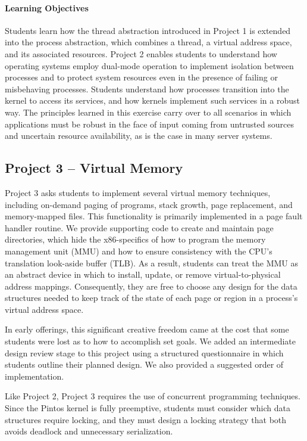 \paragraph{Learning Objectives}
Students learn how the thread abstraction introduced in Project 1 is 
extended into the process abstraction, which combines a thread, a virtual address space, 
and its associated resources.
Project 2 enables students to understand how operating systems employ dual-mode
operation to implement isolation between processes and to protect system resources
even in the presence of failing or misbehaving processes.  
Students understand how processes transition into the kernel to access its services,
and how kernels implement such services in a robust way.
The principles learned in this exercise carry over to all scenarios
in which applications must be robust in the face of input coming from untrusted 
sources and uncertain resource availability, as is the case in many server systems.

\subsection{Project 3 -- Virtual Memory}
Project 3 asks students to implement several virtual memory techniques, including
on-demand paging of programs, stack growth, page replacement, and memory-mapped files.
This functionality is primarily implemented in a page fault handler routine.
We provide supporting code to create and maintain page directories, which hide
the x86-specifics of how to program the memory management unit (MMU) and how
to ensure consistency with the CPU's translation look-aside buffer (TLB).  
As a result, students can treat the MMU as an abstract device in which to 
install, update, or remove virtual-to-physical address mappings.
Consequently, they are free to choose any design for the data structures needed to
keep track of the state of each page or region in a process's virtual address 
space.

In early offerings, this significant creative freedom came at the cost that 
some students were lost as to how to accomplish set goals.  We added an intermediate
design review stage to this project using a structured questionnaire in which students 
outline their planned design.  We also provided a suggested order of implementation.

Like Project 2, Project 3 requires the use of concurrent programming techniques.  
Since the Pintos kernel is fully preemptive, students must consider which data structures
require locking, and they must design a locking strategy that both avoids deadlock
and unnecessary serialization.

